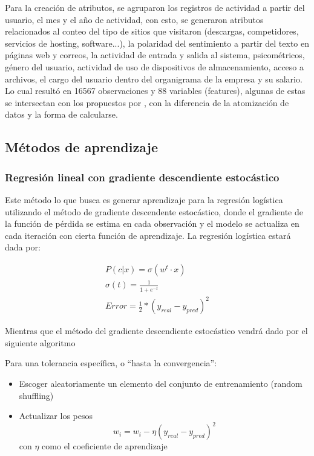 \documentclass[runningheads]{llncs}
\begin{document}
Para la creación de atributos, se agruparon los registros de actividad a partir del usuario, el mes y el año de actividad, con esto, se generaron atributos relacionados al conteo del tipo de sitios que visitaron (descargas, competidores, servicios de hosting, software...), la polaridad del sentimiento a partir del texto en páginas web y correos, la actividad de entrada y salida al sistema, psicométricos, género del usuario, actividad de uso de dispositivos de almacenamiento, acceso a archivos, el cargo del usuario dentro del organigrama de la empresa y su salario. Lo cual resultó en 16567 observaciones y 88 variables (features), algunas de estas se  intersectan con los propuestos por \cite{noever2019classifier}, con la diferencia de la atomización de datos y la forma de calcularse.

\subsection{Métodos de aprendizaje}
\label{sec:ml}

\subsubsection{Regresión lineal con gradiente descendiente estocástico}

Este método lo que busca es generar aprendizaje para la regresión logística utilizando el método de gradiente descendente estocástico, donde el gradiente de la función de pérdida se estima en cada observación y el modelo se actualiza en cada iteración con cierta función de aprendizaje. La regresión logística \cite{agresti2003categorical} estará dada por:

\begin{align*}
    P(c|x) = \sigma (w^{t} \cdot x) \\
    \sigma(t) = \frac{1}{1+e^{-t}} \\
    Error = \frac{1}{2} * (y_{real} - y_{pred})^2
\end{align*}

Mientras que el método del gradiente descendiente estocástico vendrá dado por el siguiente algoritmo \cite{bottou-98x}

Para una tolerancia específica, o ``hasta la convergencia'':
\begin{itemize}

    \item Escoger aleatoriamente un elemento del conjunto de entrenamiento (random shuffling)
    \item Actualizar los pesos
    \begin{equation}
        w_i = w_i - \eta(y_{real} - y_{pred})^2
    \end{equation}
    con $\eta$   como el coeficiente de aprendizaje
\end{itemize}
\end{document}

